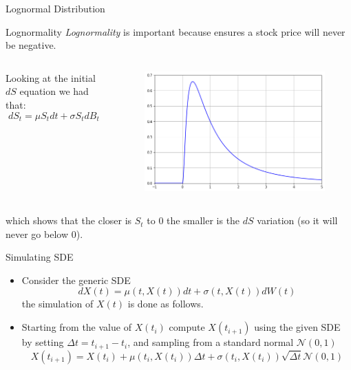 \documentclass{beamer}
\begin{document}
\begin{frame}{Lognormal Distribution}
\begin{block}{Lognormality}
  \emph{Lognormality} is important because ensures a stock price will never be negative.
  \begin{columns}
Looking at the initial $dS$ equation we had that:
\begin{equation*}
dS_t = \mu S_tdt + \sigma S_tdB_t
\end{equation*}
\begin{figure}[h]
    \begin{center}
    \includegraphics[width=0.85\linewidth]{lognormal}
    \end{center}
\end{figure}        
\end{columns}
which shows that the closer is $S_t$ to 0 the smaller is the $dS$ variation (so it will never go below 0).
\end{block}
\end{frame}

\begin{frame}{Simulating SDE}
\begin{itemize}
\item  Consider the generic SDE
\begin{equation*}
dX(t) = \mu(t,X(t))dt + \sigma(t,X(t))dW(t)
\end{equation*}
the simulation of $X(t)$ is done as follows.
\item Starting from the value of $X(t_i)$ compute $X(t_{i+1})$ using the given SDE by setting $\Delta t = t_{i+1} - t_{i}$, and sampling from a standard normal $\mathcal{N}(0,1)$
\begin{equation*}
X(t_{i+1}) = X(t_i) + \mu(t_i,X(t_i))\Delta t + \sigma(t_i,X(t_i))\sqrt{\Delta t}\mathcal{N}(0,1)
\end{equation*}
\end{itemize}
\end{frame}
\end{document}
